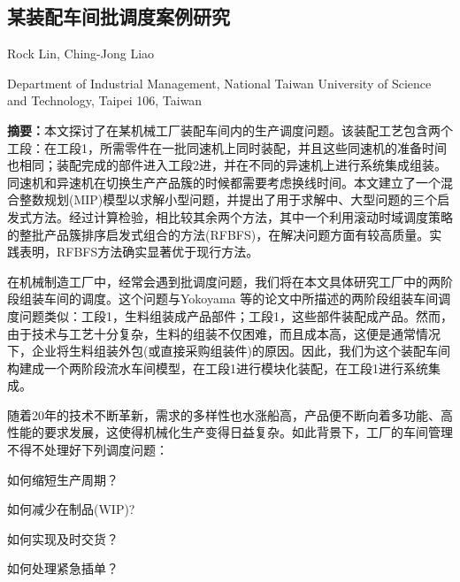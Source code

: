 \begin{Abstract}
\chapter*{某装配车间批调度案例研究}
\begin{center}
\vspace{2mm}
{
 {\xiaosi Rock Lin, Ching-Jong Liao}

 {\xiaowu Department of Industrial Management, National Taiwan University of Science and Technology, Taipei 106, Taiwan}
}
\end{center}
{\songti 
\noindent \xiaowu\textbf{摘要：}本文探讨了在某机械工厂装配车间内的生产调度问题。该装配工艺包含两个工段：在工段1，所需零件在一批同速机上同时装配，并且这些同速机的准备时间也相同；装配完成的部件进入工段2进，并在不同的异速机上进行系统集成组装。同速机和异速机在切换生产产品簇的时候都需要考虑换线时间。本文建立了一个混合整数规划(MIP)模型以求解小型问题，并提出了用于求解中、大型问题的三个启发式方法。经过计算检验，相比较其余两个方法，其中一个利用滚动时域调度策略的整批产品簇排序启发式组合的方法(RFBFS)，在解决问题方面有较高质量。实践表明，RFBFS方法确实显著优于现行方法。

}
\end{Abstract}
在机械制造工厂中，经常会遇到批调度问题，我们将在本文具体研究工厂中的两阶段组装车间的调度。这个问题与Yokoyama 等的论文中所描述的两阶段组装车间调度问题类似：工段1，生料组装成产品部件；工段1，这些部件装配成产品。然而，由于技术与工艺十分复杂，生料的组装不仅困难，而且成本高，这便是通常情况下，企业将生料组装外包(或直接采购组装件)的原因。因此，我们为这个装配车间构建成一个两阶段流水车间模型，在工段1进行模块化装配，在工段1进行系统集成。

随着20年的技术不断革新，需求的多样性也水涨船高，产品便不断向着多功能、高性能的要求发展，这使得机械化生产变得日益复杂。如此背景下，工厂的车间管理不得不处理好下列调度问题：
\begin{compactenum}[(1)]
\item 如何缩短生产周期？
\item 如何减少在制品(WIP)?
\item 如何实现及时交货？
\item 如何处理紧急插单？
\end{compactenum}

